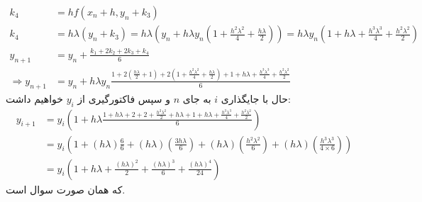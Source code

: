{\begin{enumerate}
\begin{align*}
        k_4 &= hf(x_n + h, y_n + k_3) \\
        k_4 &= h \lambda (y_n + k_3) = h \lambda (y_n + h \lambda y_n (1 + \frac{h^2 \lambda^2}{4} + \frac{h \lambda}{2})) = h \lambda y_n (1 + h \lambda + \frac{h^3 \lambda^3}{4} + \frac{h^2 \lambda^2}{2}) \\
        y_{n + 1} &= y_{n} + \frac{k_1 + 2k_2 + 2k_3 + k_4}{6} \\
        \Rightarrow y_{n + 1} &= y_{n} + h \lambda y_{n} \frac{1 + 2(\frac{h \lambda}{2} + 1) + 2(1 + \frac{h^2 \lambda^2}{4} + \frac{h \lambda}{2}) + 1 + h \lambda + \frac{h^3 \lambda^3}{4} + \frac{h^2 \lambda^2}{2}}{6}
    \end{align*}
    حال با جایگذاری $i$
    به جای 
    $n$
    و سپس فاکتورگیری از 
    $y_i$
    خواهیم داشت:
    \begin{align*}
        y_{i + 1} &= y_i (1 + h\lambda \frac{1 + h\lambda + 2 + 2 + \frac{h^2 \lambda^2}{2} + h\lambda + 1 + h\lambda + \frac{h^3 \lambda^3}{4} + \frac{h^2 \lambda^2}{2}}{6}) \\
        &= y_i (1 + (h \lambda) \frac{6}{6} + (h \lambda) (\frac{3 h \lambda}{6}) + (h\lambda)(\frac{h^2 \lambda^2}{6}) + (h\lambda) (\frac{h^3 \lambda^3}{4 \times 6})) \\
        &= y_i (1 + h\lambda + \frac{(h \lambda)^2}{2} + \frac{(h \lambda)^3}{6} +\frac{(h\lambda)^4}{24})
    \end{align*}
    که همان صورت سوال است.
\end{enumerate}
}

